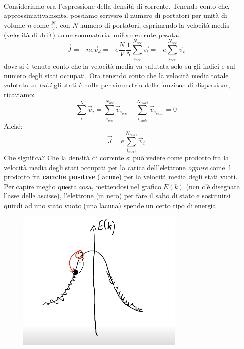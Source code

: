 \documentclass{book}
\begin{document}
                    \paragraph{}
                        Consideriamo ora l'espressione della densità di corrente. Tenendo conto che, approssimativamente, possiamo scrivere il numero di portatori per unità di volume $n$ come $\frac{N}{V}$, con $N$ numero di portatori, esprimendo la velocità media (velocità di drift) come sommatoria uniformemente pesata:
                        $$\vec{J} = -ne\vec{v}_{d} = -e \frac{N}{V} \frac{1}{N} \sum_{i_{occ}} ^{N_{occ}} \vec{v_{i}} = -e \sum_{i_{occ}} ^{N_{occ}} \vec{v}_{i}$$
                        dove si è tenuto conto che la velocità media va valutata solo su gli indici e sul numero degli stati occupati. Ora tenendo conto che la velocità media totale valutata su \textit{tutti} gli stati è nulla per simmetria della funzione di dispersione, ricaviamo:
                        $$\sum_{i} ^{N} \vec{v}_{i} = \sum_{i_{occ}} ^{N_{occ}} \vec{v}_{i_{occ}}+\sum_{i_{vuoti}} ^{N_{vuoti}} \vec{v}_{i_{vuoti}} = 0$$
                        Alché:
                        $$\vec{J} = e \sum_{i_{vuoti}} ^{N_{vuoti}} \vec{v}_{i}$$
                        Che significa? Che la densità di corrente si può vedere come prodotto fra la velocità media degli stati occupati per la carica dell'elettrone \textit{oppure} come il prodotto fra \textbf{cariche positive} (lacune) per la velocità media degli stati vuoti.
                        Per capire meglio questa cosa, mettendosi nel grafico $E(k)$ (non c'è disegnata l'asse delle ascisse), l'elettrone (in nero) per fare il salto di stato e sostituirsi quindi ad uno stato vuoto (una lacuna) spende un certo tipo di energia.
                        \begin{figure}[h!]
                            \centering
                            \includegraphics[width=0.5\linewidth]{img/radio1.png}
                        \end{figure}
\end{document}
